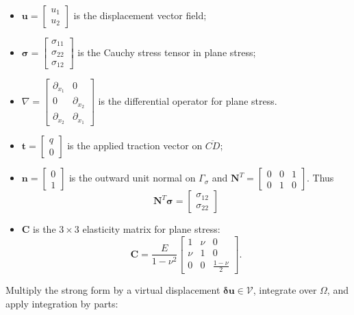 \documentclass[12pt]{article}
\begin{document}
\begin{itemize}
	\item \( \mathbf{u} = \begin{bmatrix} u_1 \\ u_2 \end{bmatrix} \) is the displacement vector field;
	\item \( \boldsymbol{\sigma}= \begin{bmatrix} \sigma_{11} \\ \sigma_{22} \\ \sigma_{12} \end{bmatrix} \) is the Cauchy stress tensor in plane stress;
	\item $\nabla=\begin{bmatrix} \partial_{x_1} & 0 \\ 0 & \partial_{x_2} \\ \partial_{x_2} & \partial_{x_1}  \end{bmatrix}$ is the differential operator for plane stress.
	\item \( \mathbf{t} = \begin{bmatrix} q \\ 0 \end{bmatrix} \) is the applied traction vector on \( \overline{CD} \);
	\item \( \mathbf{n} = \begin{bmatrix} 0 \\ 1 \end{bmatrix} \) is the outward unit normal on \( \Gamma_\sigma \) and $\mathbf{N}^T=\begin{bmatrix}0 & 0 & 1 \\ 0 & 1 & 0\end{bmatrix}$. Thus
	      $$\mathbf{N}^T\boldsymbol{\sigma}=\begin{bmatrix}\sigma_{12} \\\sigma_{22} \end{bmatrix}$$
	\item  \( \mathbf{C} \) is the \( 3 \times 3 \) elasticity matrix for plane stress:
	      \[
		      \mathbf{C} =
		      \frac{E}{1 - \nu^2}
		      \begin{bmatrix}
			      1   & \nu & 0                 \\
			      \nu & 1   & 0                 \\
			      0   & 0   & \frac{1 - \nu}{2}
		      \end{bmatrix}.
	      \]
\end{itemize}
Multiply the strong form by a virtual displacement \( \boldsymbol{\delta u} \in \mathcal{V} \), integrate over \( \Omega \), and apply integration by parts:
\end{document}
